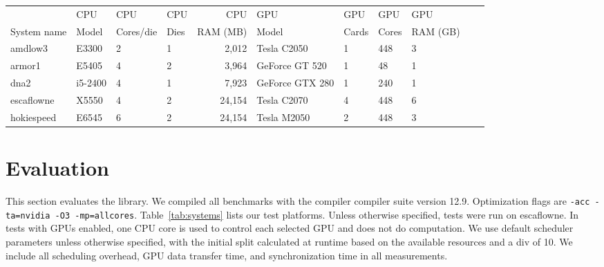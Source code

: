 \begin{table*}[t]
    \centering
    \scriptsize{
    \begin{tabular}{|l|l|l|l|r|l|l|l|l|r|l|}
\hline
		    & CPU     & CPU       & CPU  & CPU         & GPU             & GPU   & GPU   & GPU\\
	System name & Model   & Cores/die & Dies & RAM (MB)    & Model           & Cards & Cores & RAM (GB)\\
\hline
	amdlow3     & E3300   & 2         & 1    & 2,012       & Tesla C2050     & 1     & 448   & 3\\
	armor1      & E5405   & 4         & 2    & 3,964       & GeForce GT 520  & 1     & 48    & 1\\
	dna2        & i5-2400 & 4         & 1    & 7,923       & GeForce GTX 280 & 1     & 240   & 1\\
	escaflowne  & X5550   & 4         & 2    & 24,154      & Tesla C2070     & 4     & 448   & 6\\
	hokiespeed  & E6545   & 6         & 2    & 24,154      & Tesla M2050     & 2     & 448   & 3\\
\hline

    \end{tabular}
    }
    \caption{Test system specifications, all CPUs and GPUs are made by Intel and NVIDIA respectively.}
    \label{tab:systems}
\end{table*}

\section{Evaluation}
\label{sec:results}

This section evaluates the \tsar library. We compiled all benchmarks with the
\pgia compiler compiler suite version 12.9.  Optimization flags are \verb#-acc -ta=nvidia -O3 -mp=allcores#.
Table~\ref{tab:systems} lists our test platforms. Unless otherwise specified,
tests were run on escaflowne.  In tests with
GPUs enabled, one CPU core is used to control each selected GPU and does not do
computation. We use default scheduler parameters unless otherwise specified,
with the initial split calculated at runtime based on the available resources
and a div of 10. We include all scheduling overhead, GPU data transfer time,
and synchronization time in all measurements.


